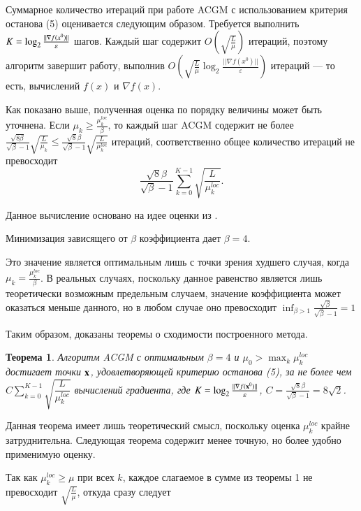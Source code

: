 \documentclass{crm-article}
\newtheorem{theorems}{Теорема}
\begin{document}
Суммарное количество итераций при работе ACGM с использованием критерия останова (5) оценивается следующим образом. Требуется выполнить $\\ K=\log_2\frac{||\nabla f(x^0)||}{\varepsilon}$ шагов. Каждый шаг содержит $O\left(\sqrt{\frac{L}{\mu}}\right)$ итераций, поэтому алгоритм завершит работу, выполнив $O\left(\sqrt{\frac{L}{\mu}}\log_2\frac{||\nabla f(x^0)||}{\varepsilon}\right)$ итераций --- то есть, вычислений $f(x)$ и $\nabla f(x)$.

Как показано выше, полученная оценка по порядку величины может быть уточнена. Если $\mu_k \geq \frac{\mu_k^{loc}}{\beta}$, то каждый шаг ACGM содержит не более $\frac{\sqrt{8\beta}}{\sqrt{\beta}-1}\sqrt{\frac{L}{\mu_k}}\leq \frac{\sqrt{8}\beta}{\sqrt{\beta}-1}\sqrt{\frac{L}{\mu_k^{loc}}}$ итераций, соответственно общее количество итераций не превосходит
$$\frac{\sqrt{8}\beta}{\sqrt{\beta}-1}\sum\limits_{k=0}^{K-1} \sqrt{\frac{L}{\mu_k^{loc}}}.$$

Данное вычисление основано на идее оценки из \cite{gasnikov2018entropy}.

Минимизация зависящего от $\beta$ коэффициента дает $\beta=4$.

Это значение является оптимальным лишь с точки зрения худшего случая, когда $\mu_k=\frac{\mu_k^{loc}}{\beta}$. В реальных случаях, поскольку данное равенство является лишь теоретически возможным предельным случаем, значение коэффициента может оказаться меньше данного, но в любом случае оно превосходит $\inf_{\beta>1}\frac{\sqrt{\beta}}{\sqrt{\beta}-1}=1$

Таким образом, доказаны теоремы о сходимости построенного метода.

\begin{theorems}
Алгоритм ACGM с оптимальным $\beta=4$ и $\mu_0>\max_k \mu_k^{loc}$ достигает точки ${\bf x}$, удовлетворяющей критерию останова (5), за не более чем $C\sum\limits_{k=0}^{K-1} \sqrt{\dfrac{L}{\mu_k^{loc}}}$ вычислений градиента, где $K=\log_2\frac{||\nabla f({\bf x}^0)||}{\varepsilon}$, $C=\frac{\sqrt{8}\beta}{\sqrt{\beta}-1}=8\sqrt{2}$.
\end{theorems}

Данная теорема имеет лишь теоретический смысл, поскольку оценка $\mu_k^{loc}$ крайне затруднительна. Следующая теорема содержит менее точную, но более удобно применимую оценку.

Так как $\mu_k^{loc}\geq \mu$ при всех $k$, каждое слагаемое в сумме из теоремы 1 не превосходит $\sqrt{\frac{L}{\mu}}$, откуда сразу следует
\end{document}

